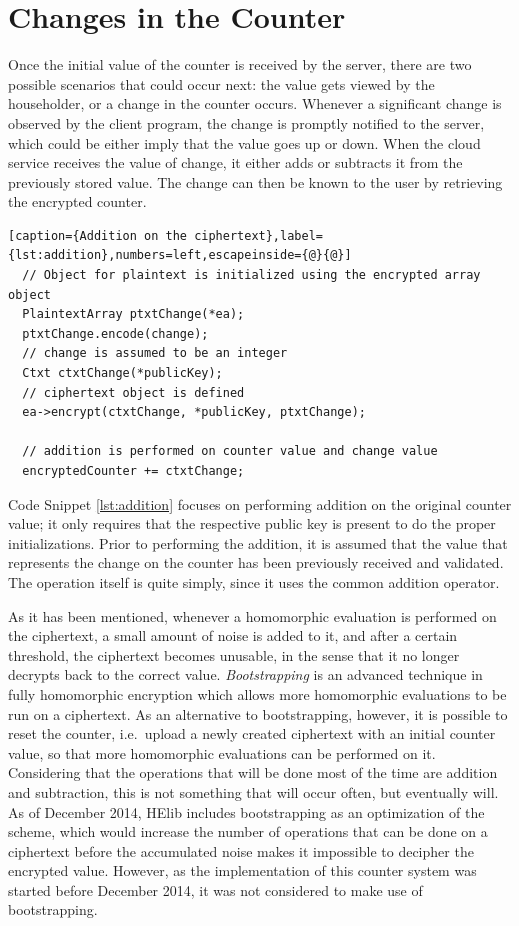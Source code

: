 \section{{Changes in the Counter}}

Once the initial value of the counter is received by the server, there are two possible scenarios that could occur next: the value gets viewed by the householder, or a change in the counter occurs. Whenever a significant change is observed by the client program, the change is promptly notified to the server, which could be either imply that the value goes up or down. When the cloud service receives the value of change, it either adds or subtracts it from the previously stored value. The change can then be known to the user by retrieving the encrypted counter.

\begin{lstlisting}[caption={Addition on the ciphertext},label={lst:addition},numbers=left,escapeinside={@}{@}]
  // Object for plaintext is initialized using the encrypted array object
  PlaintextArray ptxtChange(*ea);
  ptxtChange.encode(change); 
  // change is assumed to be an integer
  Ctxt ctxtChange(*publicKey); 
  // ciphertext object is defined 
  ea->encrypt(ctxtChange, *publicKey, ptxtChange);

  // addition is performed on counter value and change value
  encryptedCounter += ctxtChange;
\end{lstlisting}

Code Snippet \ref{lst:addition} focuses on performing addition on the original counter value; it only requires that the respective public key is present to do the proper initializations. Prior to performing the addition, it is assumed that the value that represents the change on the counter has been previously received and validated. The operation itself is quite simply, since it uses the common addition operator. 

As it has been mentioned, whenever a homomorphic evaluation is performed on the ciphertext, a small amount of noise is added to it, and after a certain threshold, the ciphertext becomes unusable, in the sense that it no longer decrypts back to the correct value. \emph{Bootstrapping} is an advanced technique in fully homomorphic encryption which allows more homomorphic evaluations to be run on a ciphertext. As an alternative to bootstrapping, however, it is possible to reset the counter, i.e.\ upload a newly created ciphertext with an initial counter value, so that more homomorphic evaluations can be performed on it.  Considering that the operations that will be done most of the time are addition and subtraction, this is not something that will occur often, but eventually will. As of December 2014, HElib includes bootstrapping as an optimization of the scheme, which would increase the number of operations that can be done on a ciphertext before the accumulated noise makes it impossible to decipher the encrypted value. However, as the implementation of this counter system was started before December 2014, it was not considered to make use of bootstrapping.

